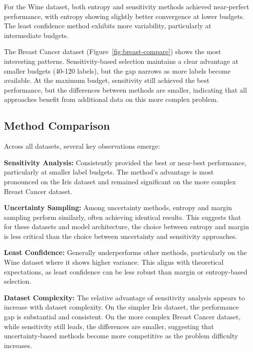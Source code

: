 \documentclass[conference]{IEEEtran}
\begin{document}
For the Wine dataset, both entropy and sensitivity methods achieved near-perfect performance, with entropy showing slightly better convergence at lower budgets. The least confidence method exhibits more variability, particularly at intermediate budgets.

The Breast Cancer dataset (Figure~\ref{fig:breast-compare}) shows the most interesting patterns. Sensitivity-based selection maintains a clear advantage at smaller budgets (40-120 labels), but the gap narrows as more labels become available. At the maximum budget, sensitivity still achieved the best performance, but the differences between methods are smaller, indicating that all approaches benefit from additional data on this more complex problem.

\subsection{Method Comparison}

Across all datasets, several key observations emerge:

\textbf{Sensitivity Analysis:} Consistently provided the best or near-best performance, particularly at smaller label budgets. The method's advantage is most pronounced on the Iris dataset and remained significant on the more complex Breast Cancer dataset.

\textbf{Uncertainty Sampling:} Among uncertainty methods, entropy and margin sampling perform similarly, often achieving identical results. This suggests that for these datasets and model architecture, the choice between entropy and margin is less critical than the choice between uncertainty and sensitivity approaches.

\textbf{Least Confidence:} Generally underperforms other methods, particularly on the Wine dataset where it shows higher variance. This aligns with theoretical expectations, as least confidence can be less robust than margin or entropy-based selection.

\textbf{Dataset Complexity:} The relative advantage of sensitivity analysis appears to increase with dataset complexity. On the simpler Iris dataset, the performance gap is substantial and consistent. On the more complex Breast Cancer dataset, while sensitivity still leads, the differences are smaller, suggesting that uncertainty-based methods become more competitive as the problem difficulty increases.
\end{document}
